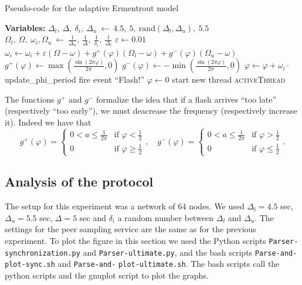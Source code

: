 \documentclass[a4paper, 11pt]{article}
\renewcommand{\epsilon}{\varepsilon}
\renewcommand{\phi}{\varphi}
\theoremstyle{plain}
\theoremstyle{definition}
\begin{document}
    \begin{algorithm}
     \caption{Pseudo-code for the adaptive Ermentrout model}
     \label{alg:adapt-er}
     \begin{algorithmic}
       \State \textbf{Variables:}
       \State $\Delta_l,\ \Delta,\ \delta_i,\ \Delta_u\ \gets\ 4.5,\ 5,\ \mathrm{rand}(\Delta_l, \Delta_u),\
       5.5$ 
       \State $\Omega_l,\ \Omega,\ \omega_i, \Omega_u\ \gets\ \frac{1}{\Delta_u},\ \frac{1}{\Delta},\
       \frac{1}{\delta_i},\ \frac{1}{\Delta_l}$
       \State $\epsilon \gets 0.01$
       \State
         \State $\omega_i \gets \omega_i + \epsilon(\Omega - \omega) + g^+(\phi)(\Omega_l - \omega) +
         g^-(\phi)(\Omega_u - \omega)$
       \EndFunction
       \State
       \State $g^+(\phi) \gets \max \left( \frac{\sin(2\pi \phi)}{2\pi}, 0 \right)$
       \State $g^-(\phi) \gets -\min \left( \frac{\sin(2\pi \phi)}{2\pi}, 0 \right)$
       \State
       \Function{updatePhi()}{}
         \If{$\phi < 1$}
           \State $\phi \gets \phi + \omega_i \cdot $update\_phi\_period
         \Else
           \State fire event ``Flash!''
           \State $\phi \gets 0$
           \State start new thread \textsc{activeThread}
         \EndIf
       \EndFunction
     \end{algorithmic}
   \end{algorithm}


   The functions $g^+$ and $g^-$ formalize the idea that if a flash arrives ``too late'' (respectively ``too
   early''), we must deacrease the frequency (respectively increase it). Indeed we have that
   \[
   g^+(\phi) = 
   \begin{cases}
     0 < a \leq \frac{1}{2\pi} & \text{if } \phi < \frac{1}{2}\\
     0 & \text{if } \phi \geq \frac{1}{2}
   \end{cases},\quad
   g^-(\phi) = 
   \begin{cases}
     0 < a \leq \frac{1}{2\pi} & \text{if } \phi > \frac{1}{2}\\
     0 & \text{if } \phi \leq \frac{1}{2}
   \end{cases}.
   \]

   
    
   \subsection{Analysis of the protocol}
   \label{sec:analysis-protocol-er}

     The setup for this experiment was a network of $64$ nodes. We used $\Delta_l = 4.5$ sec, $\Delta_u = 5.5$
     sec, $\Delta = 5$ sec and $\delta_i$ a random number between $\Delta_l$ and $\Delta_u$. The settings for
     the peer sampling service are the same as for the previous experiment. To plot the figure in
     this section we used the Python scripts \texttt{Parser-synchronization.py} and
     \texttt{Parser-ultimate.py}, and the bash scripts \texttt{Parse-and-plot-sync.sh} and
     \texttt{Parse-and-} \texttt{plot-ultimate.sh}. The bash scripts call the python scripts and the gnuplot script to
     plot the graphs.
     
\end{document}
